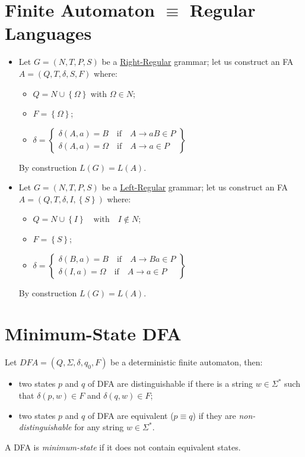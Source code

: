 \section{Finite Automaton $\equiv$ Regular Languages}
\begin{itemize}
	\item Let $G = (N, T, P, S)$ be a \underline{Right-Regular} grammar; let us construct an FA $A = (Q, T, \delta, S, F)$ where:
	\begin{itemize}
		\item $Q = N \cup \left\{\Omega\right\}$ with $\Omega \in N$;
		\item $F = \left\{\Omega\right\}$;
		\item $
			\delta = \begin{Bmatrix}
				\delta(A, a) = B \quad \text{if} \quad A \to aB \in P \\
				\delta(A, a) = \Omega \quad \text{if} \quad A \to a \in P
			\end{Bmatrix}
		$
	\end{itemize}
	By construction $L(G) = L(A)$.
	\item Let $G = (N, T, P, S)$ be a \underline{Left-Regular} grammar; let us construct an FA $A = (Q, T, \delta, I, \left\{S\right\})$ where:
	\begin{itemize}
		\item $Q = N \cup \left\{I\right\} \quad \text{with} \quad I \notin N$;
		\item $F = \left\{S\right\}$;
		\item $
			\delta = \begin{Bmatrix}
				\delta(B, a) = B \quad \text{if} \quad A \to Ba \in P \\
				\delta(I, a) = \Omega \quad \text{if} \quad A \to a \in P
			\end{Bmatrix}
		$
	\end{itemize}
	By construction $L(G) = L(A)$.
\end{itemize}

\section{Minimum-State DFA}
Let $DFA = (Q, \Sigma, \delta, q_0, F)$ be a deterministic finite automaton, then:
\begin{itemize}
	\item two states $p$ and $q$ of DFA are distinguishable if there is a string $w \in \Sigma^\ast$ such that $\delta(p, w) \in F$ and $\delta(q, w) \in F$;
	\item two states $p$ and $q$ of DFA are equivalent ($p \equiv q$) if they are \emph{non-distinguishable} for any string $w \in \Sigma^\ast$.
\end{itemize}
A DFA is \emph{minimum-state} if it does not contain equivalent states.


